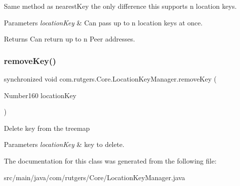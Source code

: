 Same method as nearest\+Key the only difference this supports n location keys. 
\begin{DoxyParams}{Parameters}
{\em location\+Key} & Can pass up to n location keys at once. \\
\hline
\end{DoxyParams}
\begin{DoxyReturn}{Returns}
Can return up to n Peer addresses. 
\end{DoxyReturn}
\mbox{\label{classcom_1_1rutgers_1_1Core_1_1LocationKeyManager_ad824786bd65744f1cb5eca627c4a7fe4}} 
\subsubsection{\texorpdfstring{remove\+Key()}{removeKey()}}
{\footnotesize\ttfamily synchronized void com.\+rutgers.\+Core.\+Location\+Key\+Manager.\+remove\+Key (\begin{DoxyParamCaption}\item[{Number160}]{location\+Key }\end{DoxyParamCaption})}

Delete key from the treemap 
\begin{DoxyParams}{Parameters}
{\em location\+Key} & key to delete. \\
\hline
\end{DoxyParams}


The documentation for this class was generated from the following file\+:\begin{DoxyCompactItemize}
\item 
src/main/java/com/rutgers/\+Core/Location\+Key\+Manager.\+java\end{DoxyCompactItemize}
